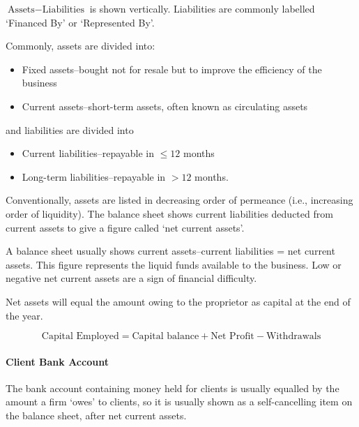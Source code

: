 \documentclass[
]{article}
\providecommand{\tightlist}{%
  \setlength{\itemsep}{0pt}\setlength{\parskip}{0pt}}
\begin{document}
\(\text{Assets} - \text{Liabilities}\) is shown vertically. Liabilities
are commonly labelled `Financed By' or `Represented By'.

Commonly, assets are divided into:

\begin{itemize}
\tightlist
\item
  Fixed assets--bought not for resale but to improve the efficiency of
  the business
\item
  Current assets--short-term assets, often known as circulating assets
\end{itemize}

and liabilities are divided into

\begin{itemize}
\tightlist
\item
  Current liabilities--repayable in \(\leq 12\) months
\item
  Long-term liabilities--repayable in \(> 12\) months.
\end{itemize}

Conventionally, assets are listed in decreasing order of permeance
(i.e., increasing order of liquidity). The balance sheet shows current
liabilities deducted from current assets to give a figure called `net
current assets'.

A balance sheet usually shows current assets--current liabilities = net
current assets. This figure represents the liquid funds available to the
business. Low or negative net current assets are a sign of financial
difficulty.

Net assets will equal the amount owing to the proprietor as capital at
the end of the year.

\[\text{Capital Employed} = \text{Capital balance} + \text{Net Profit} - \text{Withdrawals}\]

\hypertarget{client-bank-account}{%
\paragraph{Client Bank Account}\label{client-bank-account}}

The bank account containing money held for clients is usually equalled
by the amount a firm `owes' to clients, so it is usually shown as a
self-cancelling item on the balance sheet, after net current assets.
\end{document}
